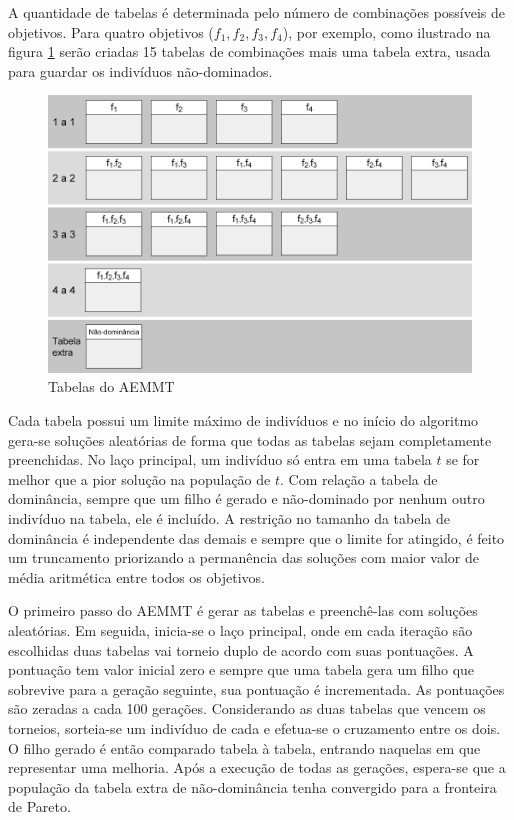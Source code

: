 A quantidade de tabelas é determinada pelo número de combinações possíveis de objetivos. Para quatro objetivos ($f_1, f_2, f_3, f_4$), por exemplo, como ilustrado na figura \ref{fig_aemmt_tabelas} serão criadas 15 tabelas de combinações mais uma tabela extra, usada para guardar os indivíduos não-dominados.

\begin{figure}
	\label{fig_aemmt_tabelas}
	\caption{Tabelas do AEMMT}
	\centering
	\includegraphics[width=1\textwidth]{cap_otimizacao-multi/figs/aeemt-tabelas}
\end{figure}

Cada tabela possui um limite máximo de indivíduos e no início do algoritmo gera-se soluções aleatórias de forma que todas as tabelas sejam completamente preenchidas. No laço principal, um indivíduo só entra em uma tabela $t$ se for melhor que a pior solução na população de $t$. Com relação a tabela de dominância, sempre que um filho é gerado e não-dominado por nenhum outro indivíduo na tabela, ele é incluído. A restrição no tamanho da tabela de dominância é independente das demais e sempre que o limite for atingido, é feito um truncamento priorizando a permanência das soluções com maior valor de média aritmética entre todos os objetivos.

O primeiro passo do AEMMT é gerar as tabelas e preenchê-las com soluções aleatórias. Em seguida, inicia-se o laço principal, onde em cada iteração são escolhidas duas tabelas vai torneio duplo de acordo com suas pontuações. A pontuação tem valor inicial zero e sempre que uma tabela gera um filho que sobrevive para a geração seguinte, sua pontuação é incrementada. As pontuações são zeradas a cada 100 gerações. Considerando as duas tabelas que vencem os torneios, sorteia-se um indivíduo de cada e efetua-se o cruzamento entre os dois. O filho gerado é então comparado tabela à tabela, entrando naquelas em que representar uma melhoria. Após a execução de todas as gerações, espera-se que a população da tabela extra de não-dominância tenha convergido para a fronteira de Pareto.

